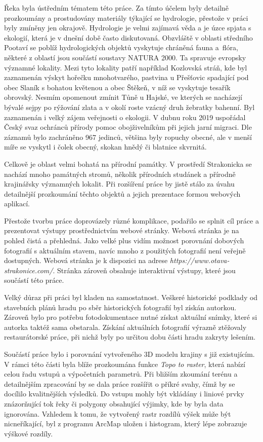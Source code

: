 \documentclass[thesis=M,czech]{FITthesis}[2012/06/26]
\begin{document}
Řeka byla ústředním tématem této práce. Za tímto účelem byly detailně prozkoumány a prostudovány materiály týkající se hydrologie, přestože v práci byly zmíněny jen okrajově. Hydrologie je velmi zajímavá věda a je úzce spjata s ekologií, která je v dnešní době často diskutovaná. Obzvláště v oblasti středního Pootaví se poblíž hydrologických objektů vyskytuje chráněná fauna a~flóra, některé z oblastí jsou součástí soustavy NATURA 2000. Ta spravuje evropsky významné lokality. Mezi tyto lokality patří například Kozlovská stráň, kde byl zaznamenán výskyt hořečku mnohotvarého, pastvina u Přešťovic spadající pod obec Slaník s bohatou květenou a obec Štěkeň, v níž se vyskytuje tesařík obrovský. Nesmím opomenout zmínit Tůně u Hajské, ve kterých se nacházejí bývalé sejpy po rýžování zlata a v okolí roste vzácný druh žebratky bahenní. Byl zaznamenán i velký zájem veřejnosti o ekologii. V dubnu roku 2019 uspořádal Český svaz ochránců přírody pomoc obojživelníkům při jejich jarní migraci. Dle záznamů bylo zachráněno 967 jedinců, většina byly ropuchy obecné, ale v menší míře se vyskytl i čolek obecný, skokan hnědý či blatnice skvrnitá.

Celkově je oblast velmi bohatá na přírodní památky. V prostředí Strakonicka se nachází mnoho památných stromů, několik přírodních studánek a přírodně krajinářsky významných lokalit. Při rozšíření práce by jistě stálo za úvahu detailnější prozkoumání těchto objektů a jejich prezentace formou webových aplikací.

Přestože tvorbu práce doprovázely různé komplikace, podařilo se splnit cíl práce a prezentovat výstupy prostřednictvím webové stránky. Webová stránka je na pohled čistá a přehledná. Jako velké plus vidím možnost porovnání dobových fotografií s aktuálním stavem, navíc mnoho z použitých fotografií není veřejně dostupných. Webová stránka je k dispozici na adrese \textit{https://www.otava-strakonice.com/}. Stránka zároveň obsahuje interaktivní výstupy, které jsou součástí této práce.

Velký důraz při práci byl kladen na samostatnost. Veškeré historické podklady od stavebních plánů hradu po sběr historických fotografií byl získán autorkou. Zároveň bylo pro potřebu fotodokumentace nutné získat aktuální snímky, které si autorka taktéž sama obstarala. Získání aktuálních fotografií výrazně ztěžovaly restaurátorské práce, při nichž byly po určitou dobu části hradu zakryty lešením. 

Součástí práce bylo i porovnání vytvořeného 3D modelu krajiny s již existujícím. V rámci této části byla blíže prozkoumána funkce \textit{Topo to raster}, která nabízí celou řadu vstupů a výpočetních parametrů. Při bližším zkoumání terénu a detailnějším zpracování by se dala práce rozšířit o příkré svahy, čímž by se docílilo kvalitnějších výsledků. Do vstupu mohly být vkládány i liniové prvky znázorňující tok řeky či polygony obsahující výjimky, kde by byla data ignorována. Vzhledem k tomu, že vytvořený rastr rozdílů výšek může být nicneříkající, byl z programu ArcMap uložen i histogram, který lépe zobrazuje výškové rozdíly.
\end{document}

